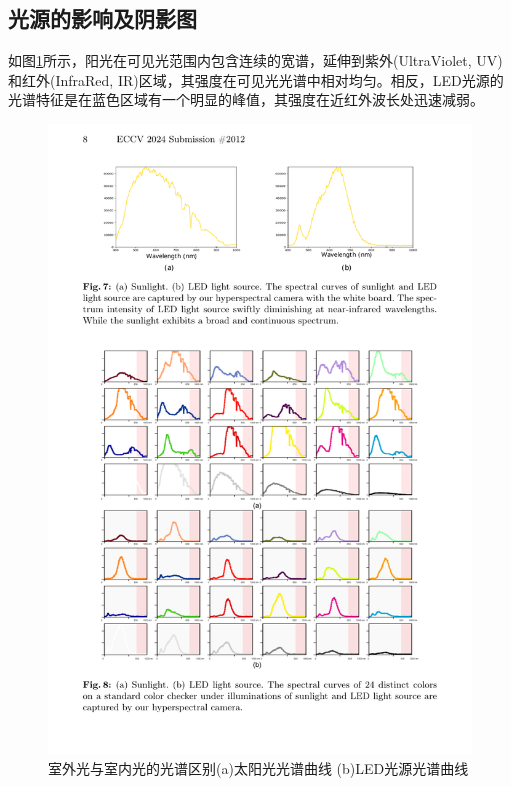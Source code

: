\documentclass[
    type = master, %
    degree = academic,        %
    decl-page,  %
  ]{njuthesis}
\begin{document}
\subsection{光源的影响及阴影图}

如图\ref{fig:sun led}所示，阳光在可见光范围内包含连续的宽谱，延伸到紫外(UltraViolet, UV)和红外(InfraRed, IR)区域，其强度在可见光光谱中相对均匀。相反，LED光源的光谱特征是在蓝色区域有一个明显的峰值，其强度在近红外波长处迅速减弱。
\begin{figure}[h]
	\centering
	\includegraphics[width=1.0\linewidth]{docs/fig-chap3/fig-3-sun-led.pdf}
	\caption{室外光与室内光的光谱区别\quad (a)太阳光光谱曲线 \quad (b)LED光源光谱曲线}
	\label{fig:sun led}
\end{figure}
\end{document}
